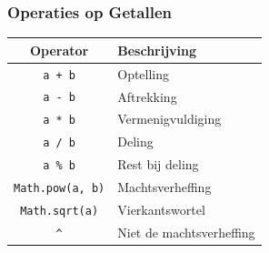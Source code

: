 \documentclass{../khlslides}
\begin{document}
\begin{frame}
  \frametitle{Operaties op Getallen}
  \begin{center}
    \begin{tabular}{cl}
      {\bf Operator} & {\bf Beschrijving} \\
      \toprule
      {\tt a + b} & Optelling \\
      {\tt a - b} & Aftrekking \\
      {\tt a * b} & Vermenigvuldiging \\
      {\tt a / b} & Deling \\
      {\tt a \% b} & Rest bij deling \\
      {\tt Math.pow(a, b)} & Machtsverheffing \\
      {\tt Math.sqrt(a)} & Vierkantswortel \\[2mm]
      {\tt \^{}} & \alert{Niet} de machtsverheffing \\
    \end{tabular}
  \end{center}
\end{frame}
\end{document}
